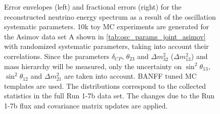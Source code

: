 \begin{figure}[htb]
\caption {
Error envelopes (left) and fractional errors (right) for the reconstructed neutrino energy spectrum
as a result of the oscillation systematic parameters.
10k toy MC experiments are generated for the Asimov data set A shown in \cref{tab:osc_params_joint_asimov}
with randomized systematic parameters, taking into account their correlations.
Since the parameters $\delta_{CP}$, $\theta_{23}$ and $\Delta m^2_{32}$ ($\Delta m^2_{13}$) and mass hierarchy
will be measured,
only the uncertainty on 
$\sin^2 \theta_{13}$,
$\sin^2 \theta_{12}$
and 
$\Delta m^2_{21}$ 
are taken into account.
BANFF tuned MC templates are used. 
The distributions correspond to the collected statistics in the full Run 1-7b data set.
The changes due to the Run 1-7b flux and covariance matrix updates are applied.
}
\label{fig:Osc_envelope_Asimov_A_run17b}
\end{figure}


